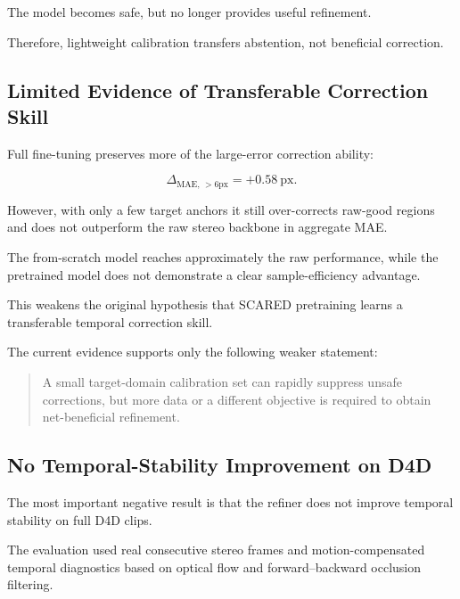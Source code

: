 \documentclass[11pt,a4paper]{article}
\begin{document}
The model becomes safe, but no longer provides useful refinement.

Therefore, lightweight calibration transfers abstention, not beneficial correction.

\subsection{Limited Evidence of Transferable Correction Skill}

Full fine-tuning preserves more of the large-error correction ability:

\begin{equation}
\Delta_{\mathrm{MAE},\,>6\mathrm{px}} = +0.58\ \mathrm{px}.
\end{equation}

However, with only a few target anchors it still over-corrects raw-good regions and
does not outperform the raw stereo backbone in aggregate MAE.

The from-scratch model reaches approximately the raw performance, while the
pretrained model does not demonstrate a clear sample-efficiency advantage.

This weakens the original hypothesis that SCARED pretraining learns a transferable
temporal correction skill.

The current evidence supports only the following weaker statement:

\begin{quote}
A small target-domain calibration set can rapidly suppress unsafe corrections, but
more data or a different objective is required to obtain net-beneficial refinement.
\end{quote}

\subsection{No Temporal-Stability Improvement on D4D}

The most important negative result is that the refiner does not improve temporal
stability on full D4D clips.

The evaluation used real consecutive stereo frames and motion-compensated temporal
diagnostics based on optical flow and forward--backward occlusion filtering.
\end{document}
